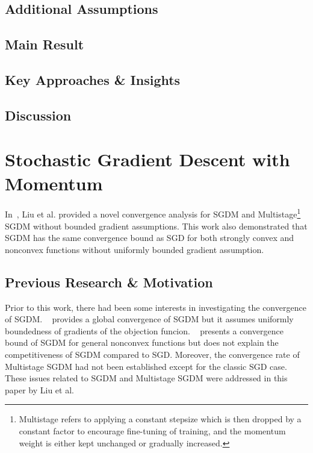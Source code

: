 \documentclass{article}
\begin{document}
\subsection{Additional Assumptions}
\subsection{Main Result}
\subsection{Key Approaches \& Insights}
\subsection{Discussion}
\newpage
\section{Stochastic Gradient Descent with Momentum}
\label{section4}
In~\cite{NEURIPS2020_d3f5d4de}, Liu et al. provided a novel convergence analysis for SGDM and Multistage\footnote{Multistage refers to applying a constant stepsize which is then dropped by a constant factor to encourage fine-tuning of training, and the momentum weight is either kept unchanged or gradually increased.} SGDM without bounded gradient assumptions. This work also demonstrated that SGDM has the same convergence bound as SGD for both strongly convex and nonconvex functions without uniformly bounded gradient assumption. 
\subsection{Previous Research \& Motivation}
Prior to this work, there had been some interests in investigating the convergence of SGDM. ~\cite{https://doi.org/10.48550/arxiv.1905.03817} provides a global convergence of SGDM but it assumes uniformly boundedness of gradients of the objection funcion. ~\cite{https://doi.org/10.48550/arxiv.1808.10396} presents a convergence bound of SGDM for general nonconvex functions but does not explain the competitiveness of SGDM compared to SGD. Moreover, the convergence rate of Multistage SGDM had not been established except for the classic SGD case. These issues related to SGDM and Multistage SGDM were addressed in this paper by Liu et al.
\end{document}
